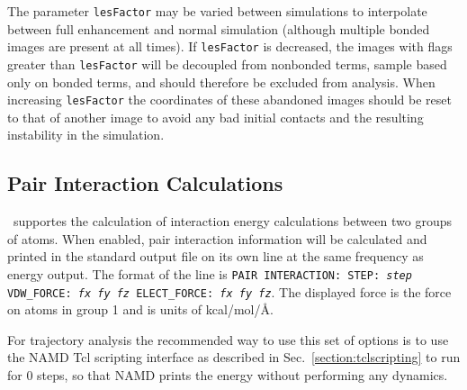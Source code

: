 The parameter {\tt lesFactor} may be varied between simulations to
interpolate between full enhancement and normal simulation (although
multiple bonded images are present at all times).  If {\tt lesFactor}
is decreased, the images with flags greater than {\tt lesFactor} will
be decoupled from nonbonded terms, sample based only on bonded terms,
and should therefore be excluded from analysis.  When increasing
{\tt lesFactor} the coordinates of these abandoned images should be
reset to that of another image to avoid any bad initial contacts and
the resulting instability in the simulation.

\subsection{Pair Interaction Calculations}
\label{section:pairinteraction}
\NAMD\ supportes the calculation of interaction energy calculations between 
two groups of atoms.  When enabled, pair interaction information will be
calculated and printed in the standard output file on its own line at the
same frequency as energy output.  The format of the line is
{\tt PAIR INTERACTION: STEP: {\it step} VDW\_FORCE: {\it fx fy fz} 
ELECT\_FORCE: {\it fx fy fz}}.
The displayed force is the force on atoms in group 1 and is units of 
kcal/mol/\AA. 

For trajectory analysis the 
recommended way to use this set of options is to use the NAMD Tcl scripting 
interface as described in Sec.~\ref{section:tclscripting} to run for
0 steps, so that NAMD prints the energy without performing any dynamics.

